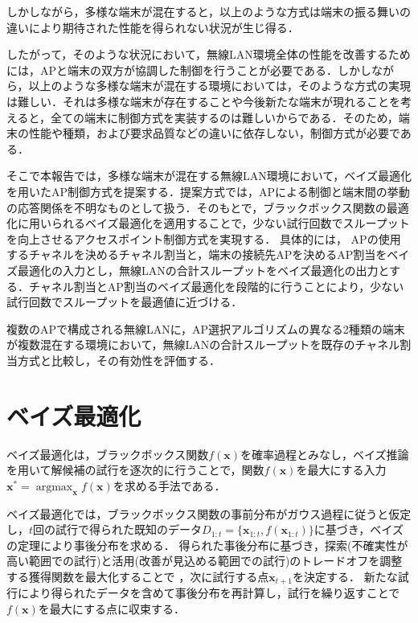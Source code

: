 \documentclass[a4paper,11pt]{jarticle}
\DeclareMathOperator*{\argmax}{argmax}
\begin{document}
しかしながら，多様な端末が混在すると，以上のような方式は端末の振る舞いの違いにより期待された性能を得られない状況が生じ得る．

したがって，そのような状況において，無線LAN環境全体の性能を改善するためには，APと端末の双方が協調した制御を行うことが必要である．しかしながら，以上のような多様な端末が混在する環境においては，そのような方式の実現は難しい．それは多様な端末が存在することや今後新たな端末が現れることを考えると，全ての端末に制御方式を実装するのは難しいからである．そのため，端末の性能や種類，および要求品質などの違いに依存しない，制御方式が必要である．

そこで本報告では，多様な端末が混在する無線LAN環境において，ベイズ最適化を用いたAP制御方式を提案する．提案方式では，APによる制御と端末間の挙動の応答関係を不明なものとして扱う．そのもとで，ブラックボックス関数の最適化に用いられるベイズ最適化を適用することで，少ない試行回数でスループットを向上させるアクセスポイント制御方式を実現する．
具体的には，
APの使用するチャネルを決めるチャネル割当と，端末の接続先APを決めるAP割当をベイズ最適化の入力とし，無線LANの合計スループットをベイズ最適化の出力とする．チャネル割当とAP割当のベイズ最適化を段階的に行うことにより，少ない試行回数でスループットを最適値に近づける．

複数のAPで構成される無線LANに，AP選択アルゴリズムの異なる2種類の端末が複数混在する環境において，無線LANの合計スループットを既存のチャネル割当方式と比較し，その有効性を評価する．

\section{ベイズ最適化}


ベイズ最適化は，ブラックボックス関数$f(\mathbf{x})$を確率過程とみなし，ベイズ推論を用いて解候補の試行を逐次的に行うことで，関数$f(\mathbf{x})$を最大にする入力$\mathbf{x}^* = \argmax_{\mathbf{x}} f(\mathbf{x})$を求める手法である．

ベイズ最適化では，ブラックボックス関数の事前分布がガウス過程に従うと仮定し，$t$回の試行で得られた既知のデータ$D_{1:t}=\{\mathbf{x}_{1:t},f(\mathbf{x}_{1:t})\}$に基づき，ベイズの定理により事後分布を求める．
得られた事後分布に基づき，探索(不確実性が高い範囲での試行)と活用(改善が見込める範囲での試行)のトレードオフを調整する獲得関数を最大化することで
，次に試行する点$\mathbf{x}_{t+1}$を決定する．
新たな試行により得られたデータを含めて事後分布を再計算し，試行を繰り返すことで$f(\mathbf{x})$を最大にする点に収束する．
\end{document}
